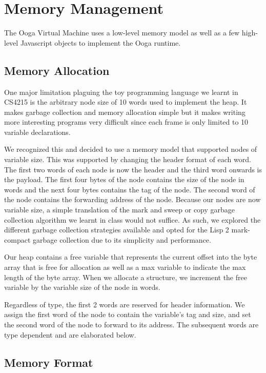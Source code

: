 \documentclass{report}
\begin{document}
\section{Memory Management}

The Ooga Virtual Machine uses a low-level memory model as well as a few high-level Javascript objects to implement the Ooga runtime.

\subsection{Memory Allocation}

One major limitation plaguing the toy programming language we learnt in CS4215 is the arbitrary node size of 10 words used to implement the heap. It makes garbage collection and memory allocation simple but it makes writing more interesting programs very difficult since each frame is only limited to 10 variable declarations.

We recognized this and decided to use a memory model that supported nodes of variable size. This was supported by changing the header format of each word. The first two words of each node is now the header and the third word onwards is the payload. The first four bytes of the node contains the size of the node in words and the next four bytes contains the tag of the node. The second word of the node contains the forwarding address of the node. Because our nodes are now variable size, a simple translation of the mark and sweep or copy garbage collection algorithm we learnt in class would not suffice. As such, we explored the different garbage collection strategies available and opted for the Lisp 2 mark-compact garbage collection due to its simplicity and performance.

Our heap contains a free variable that represents the current offset into the byte array that is free for allocation as well as a max variable to indicate the max length of the byte array. When we allocate a structure, we increment the free variable by the variable size of the node in words. 

Regardless of type, the first 2 words are reserved for header information. We assign the first word of the node to contain the variable's tag and size, and set the second word of the node to forward to its address. The subsequent words are type dependent and are elaborated below.

\subsection{Memory Format}
\end{document}
